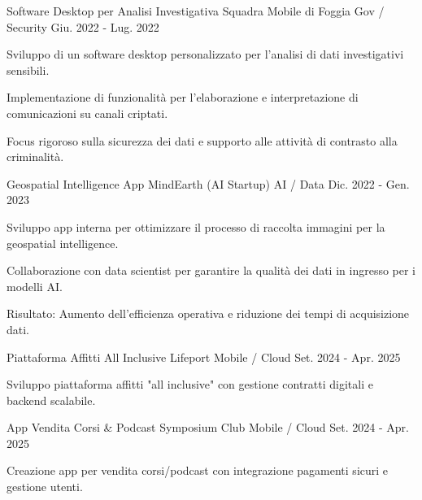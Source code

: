 
\vspace{0.3cm}

\begin{cventries}

  \cventry
  {Software Desktop per Analisi Investigativa}
  {Squadra Mobile di Foggia}
  {Gov / Security}
  {Giu. 2022 - Lug. 2022}
  {
    \begin{cvitems}
      \item {Sviluppo di un software desktop personalizzato per l'analisi di dati investigativi sensibili.}
      \item {Implementazione di funzionalità per l'elaborazione e interpretazione di comunicazioni su canali criptati.}
      \item {Focus rigoroso sulla sicurezza dei dati e supporto alle attività di contrasto alla criminalità.}
    \end{cvitems}
  }

  \vspace{0.8cm} %

  \cventry
  {Geospatial Intelligence App}
  {MindEarth (AI Startup)}
  {AI / Data}
  {Dic. 2022 - Gen. 2023}
  {
    \begin{cvitems}
      \item {Sviluppo app interna per ottimizzare il processo di raccolta immagini per la geospatial intelligence.}
      \item {Collaborazione con data scientist per garantire la qualità dei dati in ingresso per i modelli AI.}
      \item {Risultato: Aumento dell'efficienza operativa e riduzione dei tempi di acquisizione dati.}
    \end{cvitems}
  }

  \vspace{0.8cm} %

  \cventry
  {Piattaforma Affitti All Inclusive}
  {Lifeport}
  {Mobile / Cloud}
  {Set. 2024 - Apr. 2025}
  {
    \begin{cvitems}
      \item {Sviluppo piattaforma affitti "all inclusive" con gestione contratti digitali e backend scalabile.}
    \end{cvitems}
  }

  \vspace{0.8cm} %

  \cventry
  {App Vendita Corsi \& Podcast}
  {Symposium Club}
  {Mobile / Cloud}
  {Set. 2024 - Apr. 2025}
  {
    \begin{cvitems}
      \item {Creazione app per vendita corsi/podcast con integrazione pagamenti sicuri e gestione utenti.}
    \end{cvitems}
  }


\end{cventries}
